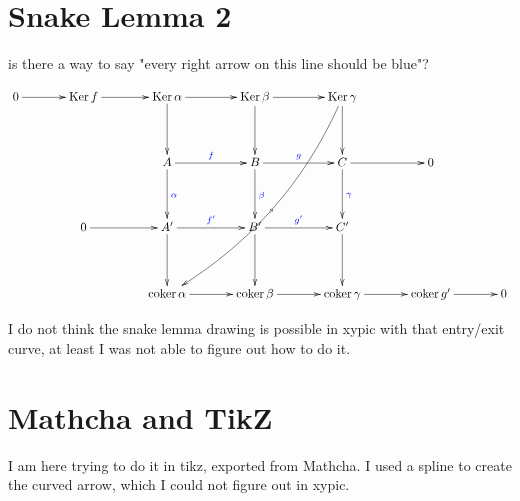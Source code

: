 \documentclass{article} %
\DeclareMathOperator{\Ker}{\text{Ker}}
\DeclareMathOperator{\Coker}{\text{coker}}
\begin{document}
\section{Snake Lemma 2}
is there a way to say "every right arrow on this line should be blue"?
\begin{center}
  \[
  \xymatrix@C=3.5em@R=4em{
  0 \ar@[red][r] & \Ker f \ar@[red][r] & \Ker \alpha \ar@[red][r] \ar[d] & \Ker \beta  \ar@[red][r] \ar[d] & \Ker \gamma \ar[d] \ar@[red]@/^1.5pc/[dddll]|{s}  \\
  & & A \ar@[blue][r]^{\color{blue} f} \ar@[blue][d]^{\color{blue} \alpha} & B \ar@[blue][r]^{\color{blue} g} \ar@[blue][d]^{\color{blue} \beta} & C \ar@[blue][r] \ar@[blue][d]^{\color{blue} \gamma}& 0 \\
  & 0 \ar@[blue][r] & A' \ar@[blue][r]^{\color{blue} f'} \ar[d] & B' \ar@[blue][r]^{ \color{blue} g'} \ar[d] & C' \ar[d] & \\
  &  & \Coker \alpha  \ar@[red][r] & \Coker \beta  \ar@[red][r] & \Coker \gamma  \ar@[red][r] & \Coker g'  \ar@[red][r] & 0 \\ 
  }
  \]
\end{center}
I do not think the snake lemma drawing is possible in xypic with that entry/exit curve, at least I was not able to figure out how to do it. 

\section{Mathcha and TikZ}
I am here trying to do it in tikz, exported from Mathcha. I used a spline to create the curved arrow, which I could not figure out in xypic.


\end{document}
